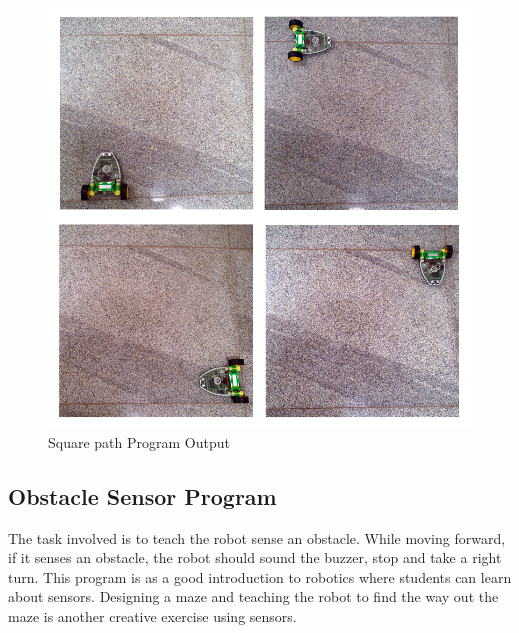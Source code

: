 \documentclass[conference]{IEEEtran}
\begin{document}
\begin{figure}[h]
\centering
\includegraphics[scale=0.3]{Fig_15.png}
\caption{Square path Program Output}
\end{figure}

\subsection{Obstacle Sensor Program}

The task involved is to teach the robot sense an obstacle. While moving forward, if it senses an obstacle, the robot should sound the buzzer, stop and take a right turn. This program is as a good introduction to robotics where students can learn about sensors. Designing a maze and teaching the robot to find the way out the maze is another creative exercise using sensors.
\end{document}

